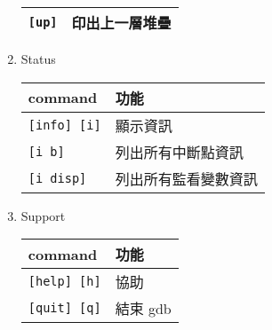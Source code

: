 \begin{enumerate}
\begin{tabular}{|l|l|}
        \verb|[up]|                     & 印出上一層堆疊 \\
        \hline
    \end{tabular}
    \item Status \par
    \begin{tabular}{|l|l|}
        \hline
        command                         & 功能 \\
        \hline
        \verb|[info] [i]|               & 顯示資訊 \\
        \verb|[i b]|                    & 列出所有中斷點資訊 \\
        \verb|[i disp]|                 & 列出所有監看變數資訊 \\
        \hline
    \end{tabular}
    \item Support \par
    \begin{tabular}{|l|l|}
        \hline
        command                         & 功能 \\
        \hline
        \verb|[help] [h]|               & 協助 \\
        \verb|[quit] [q]|               & 結束 gdb \\
        \hline
    \end{tabular}
\end{enumerate}